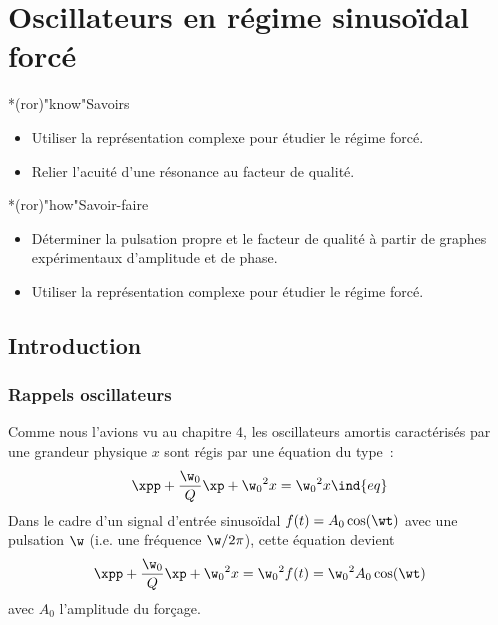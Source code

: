 \documentclass[../../main/main.tex]{subfiles}
\begin{document}
\setcounter{chapter}{5}

\chapter{Oscillateurs en r\'egime sinuso\"idal forc\'e}

\vfill

\begin{prgm}
	\begin{tcb}*(ror)"know"{Savoirs}
		\begin{itemize}[label=$\diamond$, leftmargin=10pt]
			\item Utiliser la représentation complexe pour étudier le régime forcé.
			\item Relier l’acuité d’une résonance au facteur de qualité.
		\end{itemize}
	\end{tcb}

	\begin{tcb}*(ror)"how"{Savoir-faire}
		\begin{itemize}[label=$\diamond$, leftmargin=10pt]
			\item Déterminer la pulsation propre et le facteur de qualité à partir de
			      graphes expérimentaux d’amplitude et de phase.
			\item Utiliser la représentation complexe pour étudier le régime forcé.
		\end{itemize}
	\end{tcb}
\end{prgm}

\vfill
\minitoc
\vfill

\newpage

\section{Introduction}
\subsection{Rappels oscillateurs}

Comme nous l'avions vu au chapitre 4, les oscillateurs amortis caractérisés par
une grandeur physique $x$ sont régis par une équation du type~:
\[ \xpp + \frac{\w_0}{Q} \xp + \w_0{}^2x = \w_0{}^2x\ind{eq}\]
Dans le cadre d'un signal d'entrée sinusoïdal $f(t) = A_0\cos(\wt)$ avec une
pulsation $\w$ (i.e. une fréquence $\w/2\pi$), cette équation devient
\[ \xpp + \frac{\w_0}{Q} \xp + \w_0{}^2x = \w_0{}^2f(t) = \w_0{}^2A_0\cos(\wt)\]
avec $A_0$ l'amplitude du forçage. \bigbreak
\end{document}

